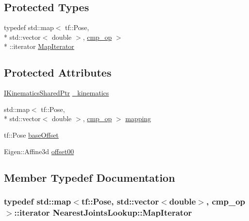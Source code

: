 \subsection*{Protected Types}
\begin{DoxyCompactItemize}
\item 
typedef std\-::map$<$ tf\-::\-Pose, \\*
std\-::vector$<$ double $>$, \hyperlink{structNearestJointsLookup_1_1cmp__op}{cmp\-\_\-op} $>$\\*
\-::iterator \hyperlink{classNearestJointsLookup_afb47e81ae413afb69057e08ab875d10b}{Map\-Iterator}
\end{DoxyCompactItemize}
\subsection*{Protected Attributes}
\begin{DoxyCompactItemize}
\item 
\hyperlink{Kinematics_8h_aa720b9842c846588baf215581fb9f902}{I\-Kinematics\-Shared\-Ptr} \hyperlink{classNearestJointsLookup_a69da920a075aa530137c8e14a0a4cd29}{\-\_\-kinematics}
\item 
std\-::map$<$ tf\-::\-Pose, \\*
std\-::vector$<$ double $>$, \hyperlink{structNearestJointsLookup_1_1cmp__op}{cmp\-\_\-op} $>$ \hyperlink{classNearestJointsLookup_ab60905a02c612e64df13dfa6de3cbe1f}{mapping}
\item 
tf\-::\-Pose \hyperlink{classNearestJointsLookup_a8cba42bc78dd12e06e2e55ba322ee54a}{base\-Offset}
\item 
Eigen\-::\-Affine3d \hyperlink{classNearestJointsLookup_aedeee24c67ca93205bdb25d8c5a25f0e}{offset00}
\end{DoxyCompactItemize}


\subsection{Member Typedef Documentation}
\hypertarget{classNearestJointsLookup_afb47e81ae413afb69057e08ab875d10b}{
\subsubsection[{Map\-Iterator}]{\setlength{\rightskip}{0pt plus 5cm}typedef std\-::map$<$tf\-::\-Pose, std\-::vector$<$double$>$, {\bf cmp\-\_\-op}$>$\-::iterator {\bf Nearest\-Joints\-Lookup\-::\-Map\-Iterator}\hspace{0.3cm}{\ttfamily [protected]}}}\label{classNearestJointsLookup_afb47e81ae413afb69057e08ab875d10b}


